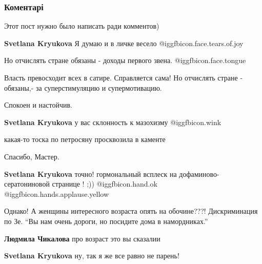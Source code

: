  
 
 
 
 
\subsubsection{Коментарі}

\begin{itemize} %
Этот пост нужно было написать ради комментов)

\begin{itemize} %
\textbf{Svetlana Kryukova} Я думаю и в личке весело @igg{fbicon.face.tears.of.joy} 

Но отчислять стране обязаны - доходы первого звена.  @igg{fbicon.face.tongue} 

Власть превосходит всех в сатире. Справляется сама!
Но отчислять стране - обязаны,-
за суперстимуляцию и супермотивацию.

Спокоен и настойчив.

\textbf{Svetlana Kryukova} у вас склонность к мазохизму @igg{fbicon.wink} 

какая-то тоска по петросяну просквозила в каменте

Спасибо, Мастер.

\textbf{Svetlana Kryukova} точно! гормональный всплеск на дофаминово- сератониновой странице ! ;)) @igg{fbicon.hand.ok}  @igg{fbicon.hands.applause.yellow} 
\end{itemize} %


Однако! А женщины интересного возраста опять на обочине???! Дискриминация по
Зе. \enquote{Вы нам очень дороги, но посидите дома в намордниках.}

\begin{itemize} %
\textbf{Людмила Чикалова} про возраст это вы сказалии

\textbf{Svetlana Kryukova} ну, так я же все равно не парень!
\end{itemize} %


\end{itemize}
